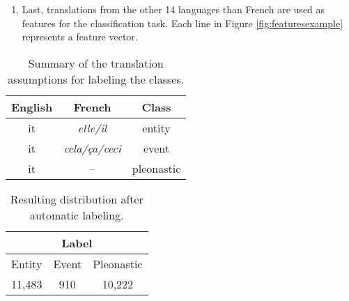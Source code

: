 \documentclass[10pt, a4paper]{article}
\begin{document}
\begin{enumerate}
\item Last, translations from the other 14 languages than French are used as features for
the classification task. Each line in Figure \ref{fig:featuresexample}
represents a feature vector.

\end{enumerate}




\begin{table}\centering \begin{tabular}{ccc} \toprule \textbf{English} &
\textbf{French} &  \textbf{Class} \\ \midrule it &  \textit{elle/il}  & entity\\
it & \textit{cela/ça/ceci} & event  \\ it  &  -- &pleonastic \\
\bottomrule
\end{tabular} 
\caption{Summary of the translation assumptions for labeling the
classes. }\label{tab:classrules} 
\end{table}



\begin{table}[h!]\centering \begin{tabular}{ccc}
\multicolumn{3}{c}{\textbf{Label}}\\ 
\toprule 
Entity & Event & Pleonastic \\
\midrule 
11,483 & 910 &10,222\\ 
\bottomrule 
\end{tabular} 
\caption{Resulting distribution after automatic labeling. }
\label{tab:resultinglabels} 
\end{table}
\end{document}
